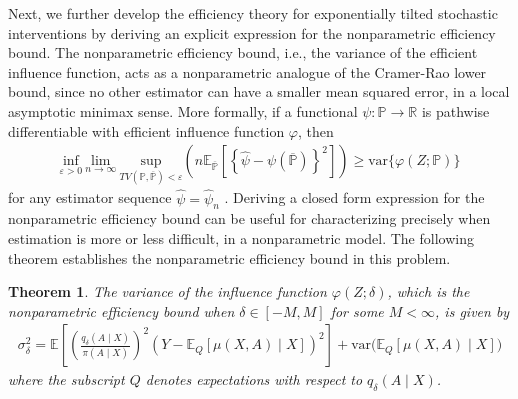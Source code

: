 \documentclass[11pt,twoside]{article}
\newcommand{\var}{\text{var}}
\newtheorem{theorem}{Theorem}
\theoremstyle{definition}
\theoremstyle{remark}
\begin{document}
Next, we further develop the efficiency theory for exponentially tilted stochastic interventions by deriving an explicit expression for the nonparametric efficiency bound. The nonparametric efficiency bound, i.e., the variance of the efficient influence function, acts as a nonparametric analogue of the Cramer-Rao lower bound, since no other estimator can have a smaller mean squared error, in a local asymptotic minimax sense. More formally, if a functional $\psi : \mathbb{P} \to \mathbb{R}$ is pathwise differentiable with efficient influence function $\varphi$, then
\begin{align*}
    \underset{\varepsilon > 0}{\text{inf}} \: \underset{n \to \infty}{\text{lim}} \: \underset{TV(\mathbb{P}, \overline{\mathbb{P}}) < \varepsilon}{\text{sup}} \left( n \mathbb{E}_{\overline{\mathbb{P}}} \left[ \left\{ \widehat{\psi} - \psi(\overline{\mathbb{P}}) \right\}^2\right] \right) \geq \var\{\varphi(Z; \mathbb{P}) \}
\end{align*}
for any estimator sequence $\widehat{\psi} = \widehat{\psi}_n$ \citep{van2000asymptotic}. Deriving a closed form expression for the nonparametric efficiency bound can be useful for characterizing precisely when estimation is more or less difficult, in a nonparametric model. The following theorem establishes the nonparametric efficiency bound in this problem.

\begin{theorem} \label{nonpar_efficiency_bound}
The variance of the influence function $\varphi(Z;\delta)$, which is the nonparametric efficiency bound when $\delta \in [-M,M]$ for some $M<\infty$, is given by
 \begin{align*}
    \sigma^2_\delta = \mathbb{E}\left[\left(\frac{q_\delta(A \mid X)}{\pi(A \mid X)} \right)^2 (Y - \mathbb{E}_Q\left[\mu(X, A) \mid X \right])^2 \right] + \var\Big( \mathbb{E}_Q\left[\mu(X, A) \mid X \right] \Big)
\end{align*}
where the subscript $Q$ denotes expectations with respect to $q_\delta(A \mid X)$. 
\end{theorem}
\end{document}

